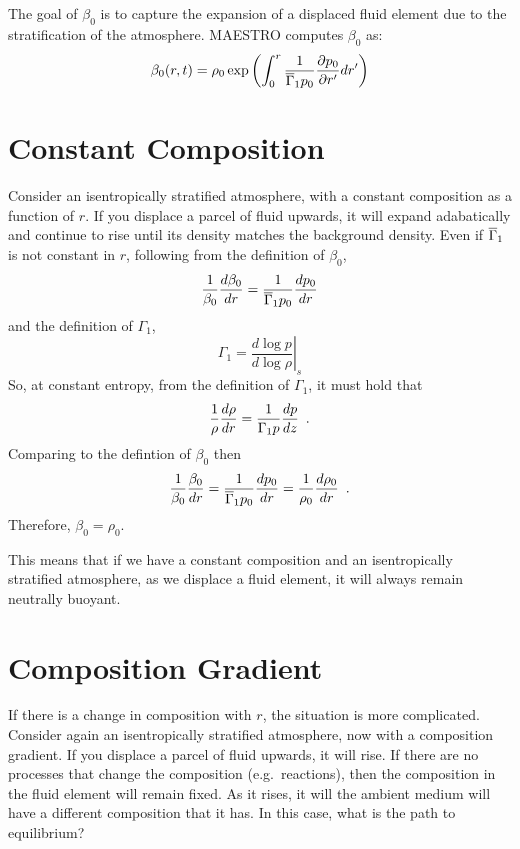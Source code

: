 The goal of $\beta_0$ is to capture the expansion of a displaced fluid
element due to the stratification of the atmosphere.  MAESTRO computes
$\beta_0$ as:
\begin{equation}
\beta_0(r,t) = \rho_0 \exp\left (  \int_0^r  \frac{1}{\overline{\Gamma}_1 p_0} \frac{\partial p_0}{\partial r^\prime} dr^\prime \right )
\end{equation}

\section{Constant Composition}
Consider an isentropically stratified atmosphere, with a constant
composition as a function of $r$.  If you displace a parcel of fluid
upwards, it will expand adabatically and continue to rise until its
density matches the background density.  Even if $\overline{\Gamma}_1$ is not
constant in $r$, following from the definition of $\beta_0$,
\begin{equation}
\frac{1}{\beta_0} \frac{d\beta_0}{dr} = \frac{1}{\overline{\Gamma}_1 p_0} \frac{dp_0}{dr}
\end{equation}
and the definition of $\Gamma_1$,
\begin{equation}
\Gamma_1 = \left . \frac{d \log p}{d \log \rho} \right |_s
\end{equation}
So, at constant entropy, from the definition of $\Gamma_1$, it must hold
that
\begin{equation}
\frac{1}{\rho} \frac{d \rho}{dr} = \frac{1}{\Gamma_1 p} \frac{d p}{dz} \enskip .
\end{equation}
Comparing to the defintion of $\beta_0$ then
\begin{equation}
\frac{1}{\beta_0} \frac{\beta_0}{dr} =\frac{1}{\overline{\Gamma}_1 p_0}\frac{dp_0}{dr} = \frac{1}{\rho_0} \frac{d\rho_0}{dr}  \enskip .
\end{equation}
Therefore, $\beta_0 = \rho_0$.  

This means that if we have a constant composition and an
isentropically stratified atmosphere, as we displace a fluid element,
it will always remain neutrally buoyant.



\section{Composition Gradient}

If there is a change in composition with $r$, the situation is more
complicated.  Consider again an isentropically stratified atmosphere,
now with a composition gradient.  If you displace a parcel of fluid
upwards, it will rise.  If there are no processes that change the
composition (e.g.\ reactions), then the composition in the fluid
element will remain fixed.  As it rises, it will the ambient medium
will have a different composition that it has.  In this case, what is
the path to equilibrium?

